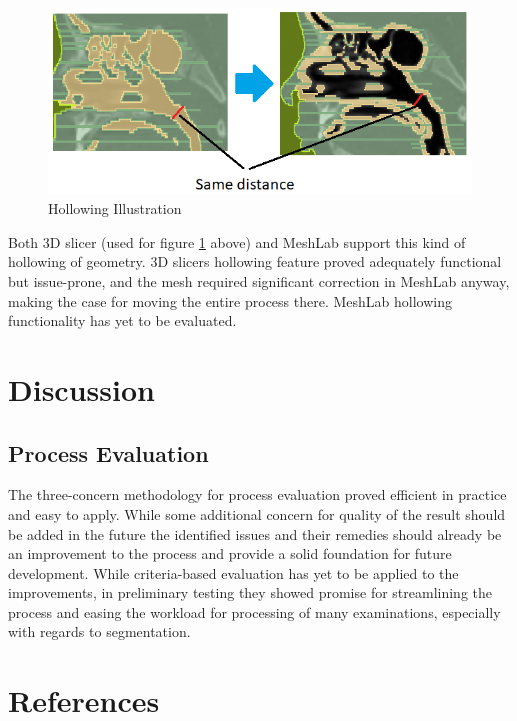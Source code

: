 \documentclass[MME,Projekt,english]{twbook}%
\newcommand{\listofcode}{\phantomsection\lstlistoflistings}
\begin{document}
\begin{figure}[!htbp]
	\centering
	\includegraphics[width=.8\linewidth]{images/hollowing-illustration}
	\caption{Hollowing Illustration}\label{hollowing-illustration}
\end{figure}

Both 3D slicer (used for figure \ref{hollowing-illustration} above) and MeshLab support this kind of hollowing of geometry. 3D slicers hollowing feature proved adequately functional but issue-prone, and the mesh required significant correction in MeshLab anyway, making the case for moving the entire process there. MeshLab hollowing functionality has yet to be evaluated.

\chapter{Discussion}

\section{Process Evaluation}
The three-concern methodology for process evaluation proved efficient in practice and easy to apply. While some additional concern for quality of the result should be added in the future the identified issues and their remedies should already be an improvement to the process and provide a solid foundation for future development.  While criteria-based evaluation has yet to be applied to the improvements, in preliminary testing they showed promise for streamlining the process and easing the workload for processing of many examinations, especially with regards to segmentation.

\newpage
\chapter{References}

\printbibliography[heading=none]

\clearpage
\listoffigures

\listoftables

\listofcode
\end{document}

